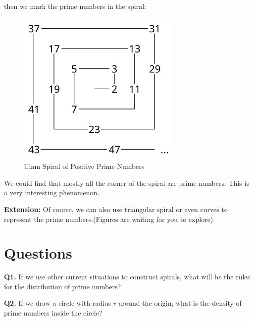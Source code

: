 \documentclass{Math_Note}
\begin{document}
then we mark the prime numbers in the spiral:

\begin{figure}[H]
    \centering
    \includegraphics[scale=0.32]{"./Figures/Ulam_spiral_2.png"}
    \caption{Ulam Spiral of Positive Prime Numbers}
\end{figure}

We could find that mostly all the corner of the spiral are prime numbers. This is a very interesting phenomenon.

\textbf{Extension:} Of course, we can also use triangular spiral or even curves to represent the prime numbers.(Figures are waiting for you to explore) 

\section{Questions}

\textbf{Q1.} If we use other current situations to construct spirals, what will be the rules for the distribution of prime numbers?

\textbf{Q2.} If we draw a circle with radius $r$ around the origin, what is the density of prime numbers inside the circle?
\end{document}
